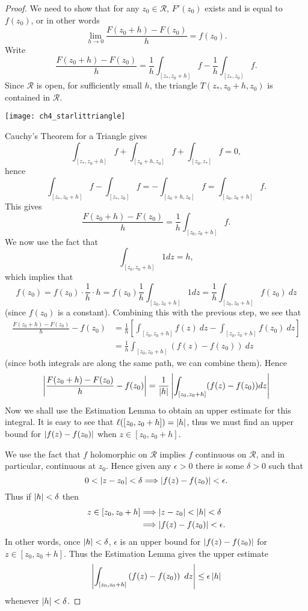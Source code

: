 \begin{proof}
We need to show that for any $z_0 \in \mathcal{R}$, $F'(z_0)$ exists and is equal to $f(z_0)$, or in other words
\[
\lim_{h \to 0} \frac{F(z_0+h)-F(z_0)}{h} = f(z_0).
\]
  Write
\[
\frac{F(z_0+h)-F(z_0)}{h} = \frac{1}{h} \int_{[z_{\ast},z_0+h]} f - \frac{1}{h} \int_{[z_{\ast},z_0]} f.
\]
Since $\mathcal{R}$ is open, for sufficiently small $h$, the triangle $T(z_{\ast},z_0+h,z_0)$ is contained in $\mathcal{R}$.
\begin{center}
\texttt{[image: ch4\_starlittriangle]}
\end{center}

  Cauchy's Theorem for a Triangle gives
\[
\int_{[z_*,z_0+h]} f + \int_{[z_0+h,z_0]} f + \int_{[z_0,z_*]} f = 0,
\]
hence
\[
\int_{[z_*,z_0+h]}f - \int_{[z_*,z_0]}f = - \int_{[z_0+h,z_0]} f = \int_{[z_0,z_0+h]} f.
\]
This gives
\[
\frac{F(z_0+h)-F(z_0)}{h} = \frac{1}{h} \int_{[z_0,z_0+h]} f.
\]
We now use the fact that
\[
\int_{[z_0,z_0+h]} 1 dz = h,
\]
which implies that
\[
f(z_0) = f(z_0) \cdot \frac{1}{h} \cdot h = f(z_0) \frac{1}{h} \int_{[z_0,z_0+h]} 1 dz = \frac{1}{h} \int_{[z_0,z_0+h]} f(z_0)\ dz
\]
(since $f(z_0)$ is a constant).  Combining this with the previous step, we see that 
\begin{align*}
 \frac{F(z_0+h)-F(z_0)}{h}-f(z_0)  &= \frac{1}{h} \left[ \int_{[z_0,z_0+h]} f(z)\ dz - \int_{[z_0,z_0+h]} f(z_0)\ dz \right] \\
& = \frac{1}{h} \int_{[z_0,z_0+h]} (f(z)-f(z_0))\ dz 
\end{align*}
(since both integrals are along the same path, we can combine them).
Hence
\[
\left|  \frac{F(z_0+h)-F(z_0)}{h}-f(z_0)  \right| = \frac{1}{\left| h \right|} \left|  \int_{[z_0,z_0+h]} (f(z)-f(z_0)) dz  \right|
\]
Now we shall use the Estimation Lemma to obtain an upper estimate for this integral.  It is easy to see that $\ell([z_0,z_0+h]) = \left| h \right|$, thus we must find an upper bound for $\left| f(z)-f(z_0) \right|$ when $z \in [z_0,z_0+h]$.


We use the fact that $f$ holomorphic on $\mathcal{R}$ implies $f$ continuous on $\mathcal{R}$, and in particular, continuous at $z_0$.  Hence given any $\epsilon >0$ there is some $\delta >0$ such that
\[
0< \left| z-z_0 \right| < \delta \Longrightarrow \left| f(z)-f(z_0) \right| < \epsilon.
\]
Thus if $\left| h \right| < \delta$ then
\begin{align*}
z \in [z_0,z_0+h] & \Longrightarrow \left| z-z_0 \right| < \left| h \right| < \delta \\
& \Longrightarrow \left| f(z)-f(z_0) \right| < \epsilon.
\end{align*}
In other words, once $\left| h \right|<\delta$, $\epsilon$ is an upper bound for $\left| f(z)-f(z_0) \right|$ for $z \in [z_0,z_0+h]$.  Thus the Estimation Lemma gives the upper estimate
\[
\left|  \int_{[z_0,z_0+h]} \left( f(z)-f(z_0) \right)\ dz  \right| \leq \epsilon \left| h \right|
\]
whenever $\left| h \right| < \delta$.


\end{proof}
